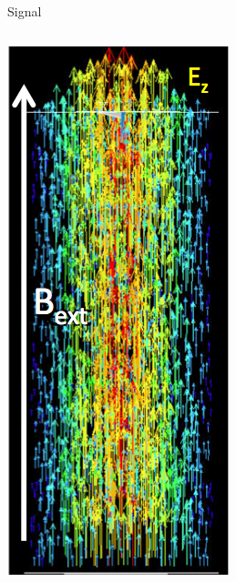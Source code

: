 \documentclass{beamer}
\begin{document}
\begin{frame}{Signal}
\begin{columns}
\includegraphics[width=\textwidth]{colorful_cavity}

\end{columns}
\end{frame}
\end{document}

